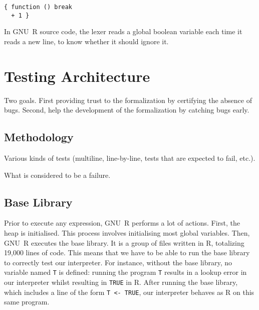 \documentclass[
    sigplan,
    10pt,
    review, %
    natbib=false %
 ]{acmart}
\begin{document}
\begin{verbatim}
{ function () break
  + 1 }
\end{verbatim}

In GNU~R source code, the lexer reads a global boolean variable
each time it reads a new line,
to know whether it should ignore it.

\todo{}


\section{Testing Architecture}
\label{sec:testing:architecture}

\todo{}

Two goals.
First providing trust to the formalization by certifying the absence of bugs.
Second, help the development of the formalization by catching bugs early.

\subsection{Methodology}
\label{sec:test:methodology}

\todo{}

Various kinds of tests (multiline, line-by-line, tests that are expected to fail, etc.).

What is considered to be a failure.

\subsection{Base Library}
\label{sec:library}

Prior to execute any expression, GNU~R performs a lot of actions.
First, the heap is initialised.
This process involves initialising most global variables.
Then, GNU~R executes the base library.
It is a group of files written in R,
totalizing 19,000 lines of code.
%
This means that we have to be able to run the base library
to correctly test our interpreter.
For instance, without the base library,
no variable named \texttt{T} is defined:
running the program \texttt{T} results in a lookup error
in our interpreter whilst resulting in \texttt{TRUE} in R.
After running the base library,
which includes a line of the form \texttt{T <- TRUE},
our interpreter behaves as R on this same program.
\end{document}
